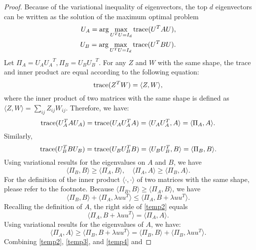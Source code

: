 \documentclass[aos,preprint]{imsart}
\theoremstyle{remark}
\begin{document}
\begin{appendix}
\begin{proof}\label{Rank-One Enlarge Projection}
Because of the variational inequality of eigenvectors, the top $d$ eigenvectors can be written as the solution of the maximum optimal problem
 \[
 \begin{aligned}
U_A = \arg\max_{U^TU = I_d} {\rm trace} (U^T A U),\\
U_B = \arg\max_{U^TU = I_d} {\rm trace} (U^T B U).
\end{aligned}
\]
Let $\Pi_A = U_A {U_A}^T,  \Pi_B = U_B {U_B}^T$. For any $Z$ and $W$ with the same shape, the trace and inner product are equal according to the following equation: 
\[
{\rm trace} (Z^TW) = \langle Z, W\rangle,
\]
where the inner product of two matrices with the same shape is defined as
$
\langle Z,W \rangle = \sum_{ij} Z_{ij} W_{ij}.
$
Therefore, we have:
\[
{\rm trace} (U_A^T A U_A) = {\rm trace} (U_A U_A^T A ) =\langle U_AU_A^T, A\rangle = \langle  \Pi_A, A\rangle.
\]
Similarly, 
\[
{\rm trace} (U_B^T B U_B) = {\rm trace} (U_B U_B^T B ) =\langle U_BU_B^T, B\rangle = \langle  \Pi_B, B\rangle.
\]
Using variational results for the eigenvalues on $A$ and $B$, we have 
\begin{equation}\label{variantional}
\langle \Pi_B , B \rangle \geq \langle \Pi_A , B \rangle,  \quad \langle \Pi_A , A \rangle \geq \langle \Pi_B , A \rangle.
\end{equation}
For the definition of the inner product $\langle \cdot, \cdot \rangle$ of two matrices with the same shape, please refer to the footnote. Because $\langle \Pi_B , B \rangle \geq \langle \Pi_A , B \rangle$, we have
\begin{equation}\label{temp2}
\langle \Pi_B, B\rangle+ \langle \Pi_A, \lambda uu^T\rangle \leq \langle \Pi_A, B+\lambda uu^T \rangle.
\end{equation}
Recalling the definition of $A$, the right side of \eqref{temp2} equals
\begin{equation}\label{temp3}
\langle \Pi_A, B+\lambda uu^T \rangle = \langle \Pi_A , A \rangle.
\end{equation}
Using variational results for the eigenvalues of $A$, we have:
\begin{equation}\label{temp4}
\langle \Pi_A , A \rangle \geq  \langle \Pi_B, B+\lambda uu^T \rangle=\langle \Pi_B, B\rangle + \langle \Pi_B, \lambda uu^T \rangle.
\end{equation}
Combining \eqref{temp2}, \eqref{temp3}, and \eqref{temp4} and

\end{proof}
\end{appendix}
\end{document}
